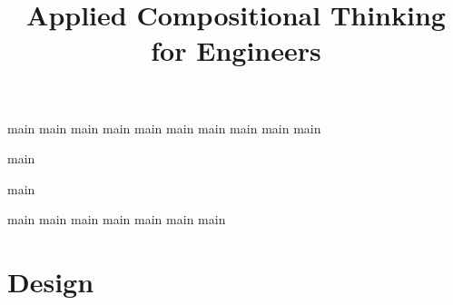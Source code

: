 \pagestyle{scrheadings}

\ohead{\pagemark}
\ihead{\headmark}
\cfoot{}
\dominitoc
\doparttoc
\setcounter{parttocdepth}{0}
\setcounter{minitocdepth}{1}

\title{Applied Compositional Thinking\\ for Engineers}
\date{}



\setcounter{tocdepth}{1}



\tableofcontents


{main}
{main}
{main}
{main}
{main}
{main}
{main}
{main}
{main}
{main}

{main}

{main}

{main}
{main}
{main}
{main}
{main}
{main}
{main}


\part{Design}\label{part:co-design}

